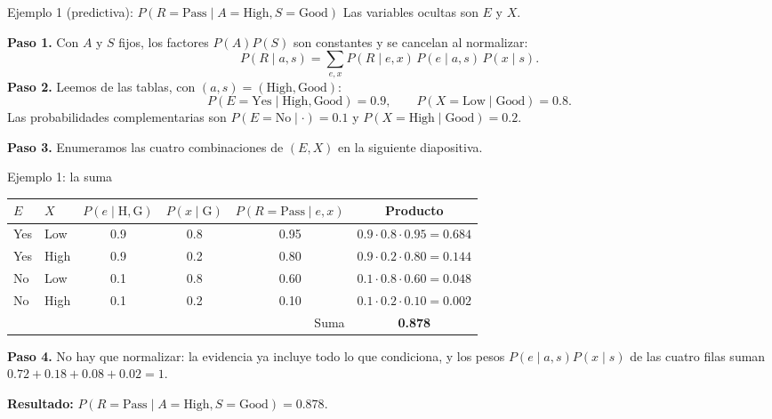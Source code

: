 \documentclass[11pt]{beamer}
\newcommand{\Pp}[1]{P\!\left(#1\right)}
\begin{document}
\begin{frame}{Ejemplo 1 (predictiva): $\Pp{R=\text{Pass}\mid A=\text{High},S=\text{Good}}$}
  Las variables ocultas son $E$ y $X$.

  \medskip
  \textbf{Paso 1.} Con $A$ y $S$ fijos, los factores $\Pp{A}\Pp{S}$ son constantes y se cancelan al normalizar:
  \[
    \Pp{R\mid a,s}=\sum_{e,x}\Pp{R\mid e,x}\,\Pp{e\mid a,s}\,\Pp{x\mid s}.
  \]
  \textbf{Paso 2.} Leemos de las tablas, con $(a,s)=(\text{High},\text{Good})$:
  \[
    \Pp{E=\text{Yes}\mid\text{High},\text{Good}}=0.9,\qquad
    \Pp{X=\text{Low}\mid\text{Good}}=0.8.
  \]
  Las probabilidades complementarias son $\Pp{E=\text{No}\mid\cdot}=0.1$ y $\Pp{X=\text{High}\mid\text{Good}}=0.2$.

  \medskip
  \textbf{Paso 3.} Enumeramos las cuatro combinaciones de $(E,X)$ en la siguiente diapositiva.
\end{frame}

\begin{frame}{Ejemplo 1: la suma}
  \footnotesize
  \begin{center}
  \begin{tabular}{llcccc}
    \toprule
    $E$ & $X$ & $\Pp{e\mid\text{H},\text{G}}$ & $\Pp{x\mid\text{G}}$ & $\Pp{R=\text{Pass}\mid e,x}$ & Producto \\
    \midrule
    Yes & Low  & 0.9 & 0.8 & 0.95 & $0.9\cdot0.8\cdot0.95=0.684$ \\
    Yes & High & 0.9 & 0.2 & 0.80 & $0.9\cdot0.2\cdot0.80=0.144$ \\
    No  & Low  & 0.1 & 0.8 & 0.60 & $0.1\cdot0.8\cdot0.60=0.048$ \\
    No  & High & 0.1 & 0.2 & 0.10 & $0.1\cdot0.2\cdot0.10=0.002$ \\
    \midrule
    \multicolumn{5}{r}{Suma} & \textbf{0.878} \\
    \bottomrule
  \end{tabular}
  \end{center}

  \normalsize
  \textbf{Paso 4.} No hay que normalizar: la evidencia ya incluye todo lo que condiciona, y los pesos $\Pp{e\mid a,s}\Pp{x\mid s}$ de las cuatro filas suman $0.72+0.18+0.08+0.02=1$.

  \medskip
  \textbf{Resultado:} $\Pp{R=\text{Pass}\mid A=\text{High},S=\text{Good}}=0.878$.
\end{frame}
\end{document}
